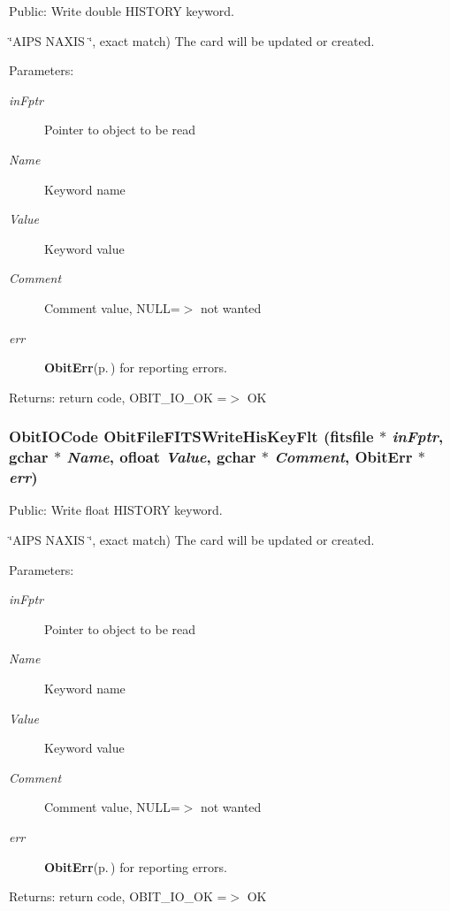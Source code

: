 Public: Write double HISTORY keyword. 

\char`\"{}AIPS   NAXIS   \char`\"{}, exact match) The card will be updated or created. \begin{Desc}
\item[Parameters:]
\begin{description}
\item[{\em in\-Fptr}]Pointer to object to be read \item[{\em Name}]Keyword name \item[{\em Value}]Keyword value \item[{\em Comment}]Comment value, NULL=$>$ not wanted \item[{\em err}]{\bf Obit\-Err}{\rm (p.\,\pageref{structObitErr})} for reporting errors. \end{description}
\end{Desc}
\begin{Desc}
\item[Returns:]return code, OBIT\_\-IO\_\-OK =$>$ OK \end{Desc}
\subsubsection{\setlength{\rightskip}{0pt plus 5cm}Obit\-IOCode Obit\-File\-FITSWrite\-His\-Key\-Flt (fitsfile $\ast$ {\em in\-Fptr}, gchar $\ast$ {\em Name}, {\bf ofloat} {\em Value}, gchar $\ast$ {\em Comment}, {\bf Obit\-Err} $\ast$ {\em err})}\label{ObitFileFITS_8h_a24}


Public: Write float HISTORY keyword. 

\char`\"{}AIPS   NAXIS   \char`\"{}, exact match) The card will be updated or created. \begin{Desc}
\item[Parameters:]
\begin{description}
\item[{\em in\-Fptr}]Pointer to object to be read \item[{\em Name}]Keyword name \item[{\em Value}]Keyword value \item[{\em Comment}]Comment value, NULL=$>$ not wanted \item[{\em err}]{\bf Obit\-Err}{\rm (p.\,\pageref{structObitErr})} for reporting errors. \end{description}
\end{Desc}
\begin{Desc}
\item[Returns:]return code, OBIT\_\-IO\_\-OK =$>$ OK \end{Desc}
